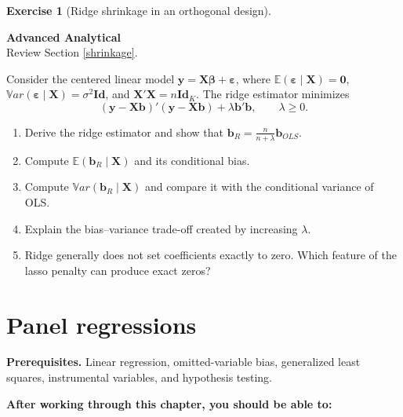\documentclass[
  11pt,
]{book}
\providecommand{\tightlist}{%
  \setlength{\itemsep}{0pt}\setlength{\parskip}{0pt}}
\theoremstyle{definition}
\theoremstyle{definition}
\theoremstyle{definition}
\newtheorem{exercise}{Exercise}[chapter]
\theoremstyle{definition}
\theoremstyle{remark}
\begin{document}
\begin{exercisebox}

\begin{exercise}[Ridge shrinkage in an orthogonal design]
\protect\hypertarget{exr:regressions-ridge-and-lasso}{}\label{exr:regressions-ridge-and-lasso}

\textbf{Advanced \textbar{} Analytical}\\
Review Section \ref{shrinkage}.

Consider the centered linear model \(\mathbf y=\mathbf X\boldsymbol\beta+\boldsymbol\varepsilon\), where \(\mathbb{E}(\boldsymbol\varepsilon\mid\mathbf X)=\mathbf0\), \(\mathbb{V}ar(\boldsymbol\varepsilon\mid\mathbf X)=\sigma^2\mathbf{Id}\), and \(\mathbf X'\mathbf X=n\mathbf{Id}_K\). The ridge estimator minimizes
\[
(\mathbf y-\mathbf X\mathbf b)'(\mathbf y-\mathbf X\mathbf b)+\lambda\mathbf b'\mathbf b,
\qquad \lambda\ge0.
\]

\begin{enumerate}
\def\labelenumi{\arabic{enumi}.}
\tightlist
\item
  Derive the ridge estimator and show that \(\mathbf b_R=\frac{n}{n+\lambda}\mathbf b_{OLS}\).
\item
  Compute \(\mathbb{E}(\mathbf b_R\mid\mathbf X)\) and its conditional bias.
\item
  Compute \(\mathbb{V}ar(\mathbf b_R\mid\mathbf X)\) and compare it with the conditional variance of OLS.
\item
  Explain the bias--variance trade-off created by increasing \(\lambda\).
\item
  Ridge generally does not set coefficients exactly to zero. Which feature of the lasso penalty can produce exact zeros?
\end{enumerate}

\end{exercise}

\end{exercisebox}

\chapter{Panel regressions}\label{Panel}

\textbf{Prerequisites.} Linear regression, omitted-variable bias, generalized least squares, instrumental variables, and hypothesis testing.

\textbf{After working through this chapter, you should be able to:}
\end{document}
